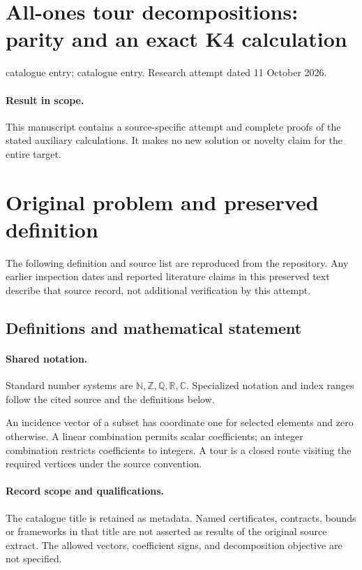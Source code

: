 \documentclass[11pt]{article}
\begin{document}
\section*{All-ones tour decompositions: parity and an exact K4 calculation}
\noindent catalogue entry; catalogue entry. Research attempt dated 11 October 2026.
\paragraph{Result in scope.}This manuscript contains a source-specific attempt and complete proofs of the stated auxiliary calculations. It makes no new solution or novelty claim for the entire target.
\section{Original problem and preserved definition}
The following definition and source list are reproduced from the repository. Any earlier inspection dates and reported literature claims in this preserved text describe that source record, not additional verification by this attempt.
\subsection{Definitions and mathematical statement}

\paragraph{Shared notation.}Standard number systems are $\mathbb N,\mathbb Z,\mathbb Q,\mathbb R,\mathbb C$. Specialized notation and index ranges follow the cited source and the definitions below.


An incidence vector of a subset has coordinate one for selected elements and zero otherwise. A linear combination permits scalar coefficients; an integer combination restricts coefficients to integers. A tour is a closed route visiting the required vertices under the source convention.
\paragraph{Record scope and qualifications.}
The catalogue title is retained as metadata. Named certificates, contracts, bounds or frameworks in that title are not asserted as results of the original source extract.
The allowed vectors, coefficient signs, and decomposition objective are not specified.
\end{document}
